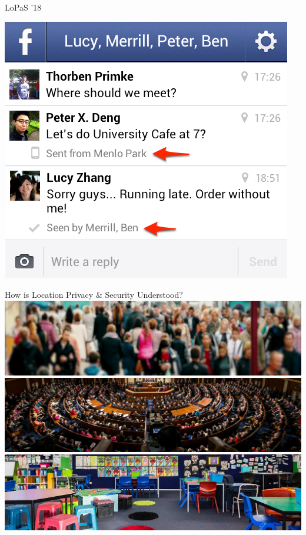 \documentclass[10pt]{beamer}
\begin{document}
\begin{frame}{LoPaS '18}
\begin{minipage}[c]{0.34\textwidth}
			\vspace{5mm}
			
			\includegraphics[width=\textwidth]{figures/screen3.jpg}
		\end{minipage}
	\end{frame}

	\begin{frame}{How is Location Privacy \& Security Understood?}
			\includegraphics[width=\textwidth]{figures/people.png}
			\includegraphics[width=\textwidth]{figures/congress.jpg}
			\includegraphics[width=\textwidth]{figures/kids.jpg}
	\end{frame}
\end{document}
